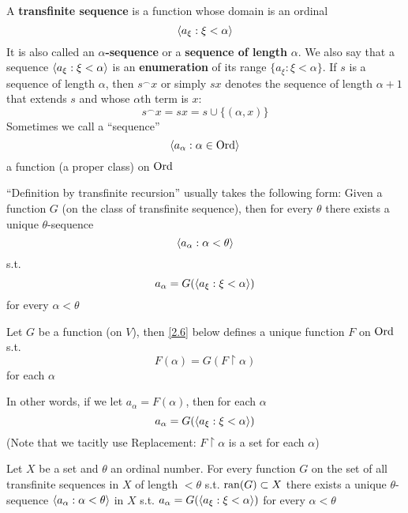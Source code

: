 \documentclass[11pt]{article}
\begin{document}
A \textbf{transfinite sequence} is a function whose domain is an ordinal
\begin{equation*}
\langle a_\xi:\xi<\alpha\rangle
\end{equation*}
It is also called an \textbf{\(\alpha\)-sequence} or a \textbf{sequence of length} \(\alpha\). We also say that a
sequence \(\langle a_\xi:\xi<\alpha\rangle\) is an \textbf{enumeration} of its range \(\{a_\xi:\xi<\alpha\}\). If \(s\) is a sequence of
length \(\alpha\), then \(s^\smallfrown x\) or simply \(sx\) denotes the sequence of length \(\alpha+1\) that
extends \(s\) and whose \(\alpha\)th term is \(x\):
\begin{equation*}
s^\smallfrown x=sx=s\cup\{(\alpha,x)\}
\end{equation*}
Sometimes we call a ``sequence''
\begin{equation*}
\langle a_\alpha:\alpha\in\text{Ord}\rangle
\end{equation*}
a function (a proper class) on \(\text{Ord}\)


``Definition by transfinite recursion'' usually takes the following form: Given a function \(G\)
(on the class of transfinite sequence), then for every \(\theta\) there exists a unique \(\theta\)-sequence
\begin{equation*}
\langle a_\alpha:\alpha<\theta\rangle
\end{equation*}
s.t.
\begin{equation*}
a_\alpha=G(\langle a_\xi:\xi<\alpha\rangle)
\end{equation*}
for every \(\alpha<\theta\)

\begin{theorem}
Let \(G\) be a function (on \(V\)), then \eqref{2.6} below defines a unique function \(F\)
on \(\text{Ord}\) s.t.
\begin{equation*}
F(\alpha)=G(F\restriction\alpha)
\end{equation*}
for each \(\alpha\)
\end{theorem}

In other words, if we let \(a_\alpha=F(\alpha)\), then for each \(\alpha\)
\begin{equation*}
a_\alpha=G(\langle a_\xi:\xi<\alpha\rangle)
\end{equation*}
(Note that we tacitly use Replacement: \(F\restriction\alpha\) is a set for each \(\alpha\))

\begin{corollary}[]
Let \(X\) be a set and \(\theta\) an ordinal number. For every function \(G\) on the set of all
transfinite sequences in \(X\) of length \(<\theta\) s.t. \(\operatorname{ran}(G)\subset X\) there exists a unique
\(\theta\)-sequence \(\langle a_\alpha:\alpha<\theta\rangle\) in \(X\) s.t. \(a_\alpha=G(\langle a_\xi:\xi<\alpha\rangle)\) for every \(\alpha<\theta\)
\end{corollary}
\end{document}
